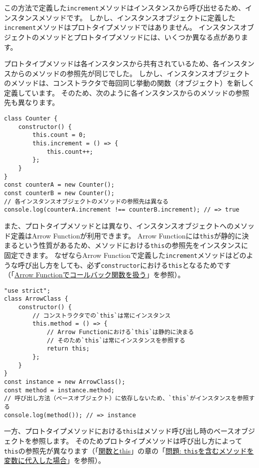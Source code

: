 この方法で定義した\texttt{increment}メソッドはインスタンスから呼び出せるため、インスタンスメソッドです。
しかし、インスタンスオブジェクトに定義した\texttt{increment}メソッドはプロトタイプメソッドではありません。
インスタンスオブジェクトのメソッドとプロトタイプメソッドには、いくつか異なる点があります。

プロトタイプメソッドは各インスタンスから共有されているため、各インスタンスからのメソッドの参照先が同じでした。
しかし、インスタンスオブジェクトのメソッドは、コンストラクタで毎回同じ挙動の関数（オブジェクト）を新しく定義しています。
そのため、次のように各インスタンスからのメソッドの参照先も異なります。

\begin{lstlisting}
class Counter {
    constructor() {
        this.count = 0;
        this.increment = () => {
            this.count++;
        };
    }
}
const counterA = new Counter();
const counterB = new Counter();
// 各インスタンスオブジェクトのメソッドの参照先は異なる
console.log(counterA.increment !== counterB.increment); // => true
\end{lstlisting}

また、プロトタイプメソッドとは異なり、インスタンスオブジェクトへのメソッド定義はArrow
Functionが利用できます。 Arrow
Functionには\texttt{this}が静的に決まるという性質があるため、メソッドにおける\texttt{this}の参照先をインスタンスに固定できます。
なぜならArrow
Functionで定義した\texttt{increment}メソッドはどのような呼び出し方をしても、必ず\texttt{constructor}における\texttt{this}となるためです（「\href{../function-this/README.md\#arrow-function-callback}{Arrow
Functionでコールバック関数を扱う}」を参照）。

\begin{lstlisting}
"use strict";
class ArrowClass {
    constructor() {
        // コンストラクタでの`this`は常にインスタンス
        this.method = () => {
            // Arrow Functionにおける`this`は静的に決まる
            // そのため`this`は常にインスタンスを参照する
            return this;
        };
    }
}
const instance = new ArrowClass();
const method = instance.method;
// 呼び出し方法（ベースオブジェクト）に依存しないため、`this`がインスタンスを参照する
console.log(method()); // => instance
\end{lstlisting}

一方、プロトタイプメソッドにおける\texttt{this}はメソッド呼び出し時のベースオブジェクトを参照します。
そのためプロトタイプメソッドは呼び出し方によって\texttt{this}の参照先が異なります（「\href{../function-this/README.md}{関数とthis}」の章の「\href{../function-this/README.md\#assign-this-function}{問題:
\texttt{this}を含むメソッドを変数に代入した場合}」を参照）。

